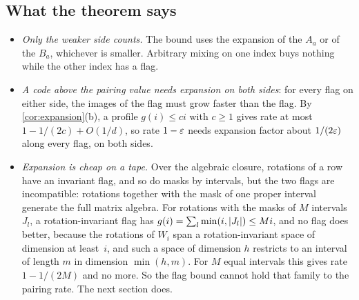 \subsection{What the theorem says}\label{sec:order-says}

\begin{itemize}[leftmargin=1.5em]
\item \emph{Only the weaker side counts.} The bound uses the expansion of the $A_a$ or of the $B_a$, whichever is
smaller. Arbitrary mixing on one index buys nothing while the other index has a flag.
\item \emph{A code above the pairing value needs expansion on both sides}: for every flag on either side, the images of
the flag must grow faster than the flag. By \cref{cor:expansion}(b), a profile $g(i)\le ci$ with $c\ge1$ gives rate at
most $1-1/(2c)+O(1/d)$, so rate $1-\varepsilon$ needs expansion factor about $1/(2\varepsilon)$ along every flag, on both sides.
\item \emph{Expansion is cheap on a tape.} Over the algebraic closure, rotations of a row have an invariant flag, and
so do masks by intervals, but the two flags are incompatible: rotations together with the mask of one proper interval
generate the full matrix algebra. For rotations with the masks of $M$ intervals $J_l$, a rotation-invariant flag has
$g(i)=\sum_l\min(i,\lvert J_l \rvert)\le Mi$, and no flag does better, because the rotations of $W_i$ span a
rotation-invariant space of dimension at least~$i$, and such a space of dimension $h$ restricts to an interval of
length $m$ in dimension $\min(h,m)$. For $M$ equal intervals this gives rate $1-1/(2M)$ and no more. So the flag
bound cannot hold that family to the pairing rate. The next section does.
\end{itemize}
